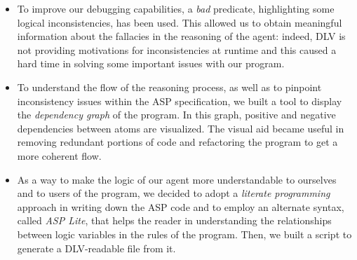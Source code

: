 \documentclass{llncs}
\begin{document}
\begin{itemize}
	\item To improve our debugging capabilities, a \emph{bad} predicate, highlighting some logical inconsistencies, has been used.
	This allowed us to obtain meaningful information about the fallacies in the reasoning of the agent: indeed, DLV is not providing motivations for inconsistencies at runtime and this caused a hard time in solving some important issues with our program.
	\item To understand the flow of the reasoning process, as well as to pinpoint inconsistency issues within the ASP specification, we built a tool to display the \emph{dependency graph} of the program.
	In this graph, positive and negative dependencies between atoms are visualized.
	The visual aid became useful in removing redundant portions of code and refactoring the program to get a more coherent flow.
	\item As a way to make the logic of our agent more understandable to ourselves and to users of the program, we decided to adopt a \emph{literate programming} approach in writing down the ASP code and to employ an alternate syntax, called \emph{ASP Lite}, that helps the reader in understanding the relationships between logic variables in the rules of the program.
	Then, we built a script to generate a DLV-readable file from it. 
\end{itemize}




\end{document}
